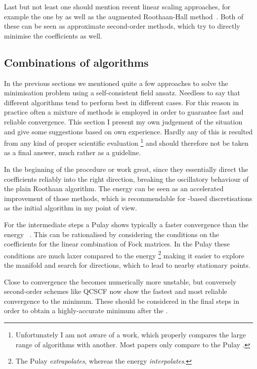 Last but not least one should mention recent linear scaling \SCF approaches,
for example the one by \citet{Salek2007}
as well as the augmented Roothaan-Hall method~\cite{Hoest2008}.
Both of these can be seen as approximate second-order \SCF methods,
which try to directly minimise the coefficients as well.

\subsection{Combinations of algorithms}
In the previous sections we mentioned quite a few approaches
to solve the \HF minimisation problem using a self-consistent field ansatz.
Needless to say that different algorithms tend to perform best in different cases.
For this reason in practice often a mixture of methods
is employed in order to guarantee fast and reliable convergence.
This section I present my own judgement of the situation
and give some suggestions based on own experience.
Hardly any of this is resulted from any kind of proper
scientific evaluation%
\footnote{Unfortunately I am not aware of a work,
which properly compares the large range of \SCF algorithms
with another.
Most papers only compare to the Pulay \DIIS.}
and should therefore not be taken as a final answer,
much rather as a guideline.

In the beginning of the procedure \ODA or \tODA work great,
since they essentially direct the coefficients reliably into the right direction,
breaking the oscillatory behaviour of the plain Roothaan algorithm.
The energy \DIIS can be seen as an accelerated improvement of those methods,
which is recommendable for \cGTO-based discretisations
as the initial \SCF algorithm in my point of view.

For the intermediate steps a Pulay \DIIS shows typically a faster
convergence than the energy \DIIS~\cite{Kudin2002}.
This can be rationalised by considering the conditions
on the coefficients for the linear combination of Fock matrices.
In the Pulay \DIIS these conditions are much laxer
compared to the energy \DIIS%
\footnote{The Pulay \DIIS \emph{extrapolates},
whereas the energy \DIIS \emph{interpolates}.}
making it easier to explore the \SCF manifold
and search for directions,
which to lead to nearby stationary points.

Close to convergence the \DIIS becomes numerically more unstable,
but conversely
second-order \SCF schemes like QCSCF now show the fastest and most reliable
convergence to the \SCF minimum.
These should be considered in the final \SCF steps in order to obtain
a highly-accurate \SCF minimum after the \DIIS.
